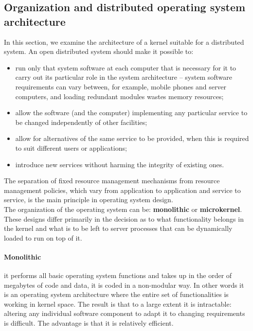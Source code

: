 \subsection{Organization and distributed operating system architecture}
In this section, we examine the architecture of a kernel suitable for a distributed system. An open distributed system should make it possible to:
\begin{itemize}
	\item run only that system software at each computer that is necessary for it to carry out its particular role in the system architecture – system software requirements can vary between, for example, mobile phones and server computers, and loading redundant modules wastes memory resources;
	
	\item allow the software (and the computer) implementing any particular service to be changed independently of other facilities;
	
	\item allow for alternatives of the same service to be provided, when this is required to suit different users or applications;
	
	\item introduce new services without harming the integrity of existing ones.
\end{itemize}
The separation of fixed resource management mechanisms from resource management policies, which vary from application to application and service to service, is the main principle in operating system design.\\
The organization of the operating system can be: \textbf{monolithic} or \textbf{microkernel}.
These designs differ primarily in the decision as to what functionality belongs in the kernel and what is to be left to server processes that can be dynamically loaded to run on top of it.

\paragraph{Monolithic} it performs all basic operating system functions and takes up in the order of megabytes of code and data, it is coded in a non-modular way. In other words it is an operating system architecture where the entire set of functionalities is working in kernel space. The result is that to a large extent it is intractable: altering any individual software component to adapt it to changing requirements is difficult. The advantage is that it is relatively efficient.

